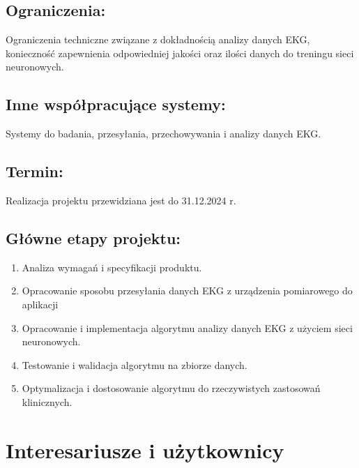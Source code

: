 \documentclass[12pt]{article}
\begin{document}
        \subsection*{Ograniczenia:}  
            Ograniczenia techniczne związane z dokładnością analizy danych EKG, konieczność zapewnienia odpowiedniej jakości oraz ilości danych do treningu sieci neuronowych.  

        \subsection*{Inne współpracujące systemy:}
            Systemy do badania, przesyłania, przechowywania i analizy danych EKG.  

        \subsection*{Termin:}  
            Realizacja projektu przewidziana jest do 31.12.2024 r.

        \subsection*{Główne etapy projektu:}
            \begin{enumerate}
                \item
                Analiza wymagań i specyfikacji produktu.  

                \item
                Opracowanie sposobu przesyłania danych EKG z urządzenia pomiarowego do aplikacji  
                
                \item
                Opracowanie i implementacja algorytmu analizy danych EKG z użyciem sieci neuronowych.   
                
                \item
                Testowanie i walidacja algorytmu na zbiorze danych.  
                
                \item
                Optymalizacja i dostosowanie algorytmu do rzeczywistych zastosowań klinicznych. 
            \end{enumerate}

    \section{Interesariusze i użytkownicy}
\end{document}
